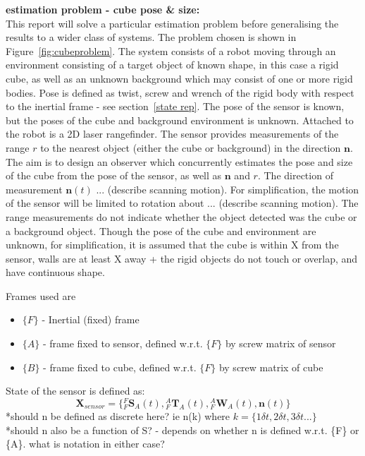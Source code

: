\textbf{estimation problem - cube pose \& size:}\\
This report will solve a particular estimation problem before generalising the results to a wider class of systems. The problem chosen is shown in Figure~\ref{fig:cubeproblem}.
The system consists of a robot moving through an environment consisting of a target object of known shape, in this case a rigid cube, as well as an unknown background which may consist of one or more rigid bodies. Pose is defined as twist, screw and wrench of the rigid body with respect to the inertial frame - see section~\ref{state rep}. The pose of the sensor is known, but the poses of the cube and background environment is unknown. Attached to the robot is a 2D laser rangefinder. The sensor provides measurements of the range $r$ to the nearest object (either the cube or background) in the direction $\mathbf{n}$. The aim is to design an observer which concurrently estimates the pose and size of the cube from the pose of the sensor, as well as $\mathbf{n}$ and $r$. 
The direction of measurement $\mathbf{n}(t)$ ... (describe scanning motion). For simplification, the motion of the sensor will be limited to rotation about ... (describe scanning motion).
The range measurements do not indicate whether the object detected was the cube or a background object. Though the pose of the cube and environment are unknown, for simplification, it is assumed that the cube is within X from the sensor, walls are at least X away + the rigid objects do not touch or overlap, and have continuous shape.


Frames used are
\begin{itemize}
\item $\{F\}$ - Inertial (fixed) frame
\item $\{A\}$ - frame fixed to sensor, defined w.r.t. $\{F\}$ by screw matrix of sensor
\item $\{B\}$ - frame fixed to cube, defined w.r.t. $\{F\}$ by screw matrix of cube
\end{itemize} 

State of the sensor is defined as:
\begin{equation}
	\mathbf{X}_{sensor} = 
	\{{^{F}_{F}\mathbf{S}^{}_{A}(t)},{^{A}_{F}\mathbf{T}^{}_{A}(t)},{^{A}_{F}\mathbf{W}^{}_{A}(t)},
	\mathbf{n}(t)\}
\end{equation}
*should n be defined as discrete here? ie n(k) where $k = \{1\delta t,2\delta t,3\delta t...\}$\\
*should n also be a function of S? - depends on whether n is defined w.r.t. \{F\} or \{A\}. what is notation in either case?

